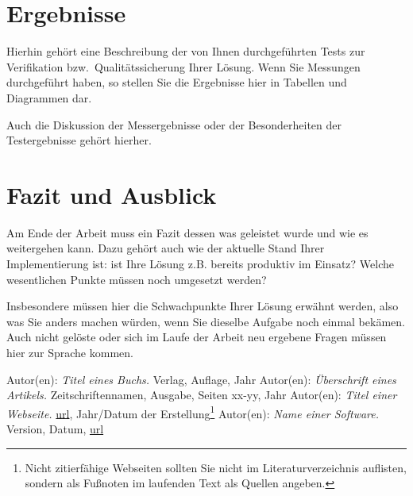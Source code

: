 \documentclass[12pt,titlepage,twoside]{article}
\begin{document}
\newpage
\section{Ergebnisse}
\label{sec:ergebnisse}
Hierhin gehört eine Beschreibung der von Ihnen durchgeführten Tests zur
Verifikation bzw.~Qualitätssicherung Ihrer Lösung. Wenn Sie Messungen
durchgeführt haben, so stellen Sie die Ergebnisse hier in Tabellen und
Diagrammen dar.

Auch die Diskussion der Messergebnisse oder der Besonderheiten der
Testergebnisse gehört hierher.

\newpage
\section{Fazit und Ausblick}
\label{sec:fazit}
Am Ende der Arbeit muss ein Fazit dessen was geleistet wurde
und wie es weitergehen kann. Dazu gehört auch wie der aktuelle
Stand Ihrer Implementierung ist: ist Ihre Lösung z.B. bereits
produktiv im Einsatz? Welche wesentlichen Punkte müssen noch
umgesetzt werden?

Insbesondere müssen hier die Schwachpunkte
Ihrer Lösung erwähnt werden, also was Sie anders machen würden,
wenn Sie dieselbe Aufgabe noch einmal bekämen. Auch nicht gelöste
oder sich im Laufe der Arbeit neu ergebene Fragen müssen hier zur
Sprache kommen.



\newpage
\begin{thebibliography}{99}
\raggedright
{} Autor(en): {\em Titel eines Buchs.}
  Verlag, Auflage, Jahr
 Autor(en): {\em Überschrift eines Artikels.}
  Zeitschriftennamen, Ausgabe, Seiten xx-yy, Jahr
 Autor(en): {\em Titel einer Webseite.}
  \url{url}, Jahr/Datum der Erstellung\footnote{Nicht zitierfähige Webseiten sollten Sie nicht im Literaturverzeichnis auflisten, sondern als Fußnoten im laufenden Text als Quellen angeben.}
 Autor(en): {\em Name einer Software.}
  Version, Datum, \url{url}
\end{thebibliography}
\end{document}
